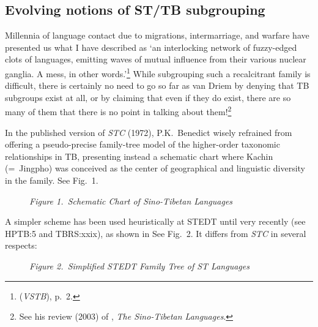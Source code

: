 \subsection{Evolving notions of ST/TB subgrouping}

Millennia of language contact due to migrations, intermarriage, and warfare have presented us what I
have described as ‘an interlocking network of fuzzy-edged clots of languages,
emitting waves of mutual influence from their various nuclear ganglia. A mess,
in other words.’\footnote{\citealt{JAM-VSTB} (\textit{VSTB}), p.~2.}  While subgrouping such
a recalcitrant family is difficult, there is certainly no need to go so far as
van Driem by denying that TB subgroups exist at all, or by claiming that even if
they do exist, there are so many of them that there is no point in talking about
them!\footnote{See his review (2003) of \citealt{STL},
\textit{The Sino-Tibetan Languages}.}


In the published version of \textit{STC} (1972),
P.K.\ Benedict wisely refrained from offering a pseudo-precise family-tree model of
the higher-order taxonomic relationships in TB, presenting instead a schematic
chart where Kachin (=~Jingpho) was conceived as the center of geographical and
linguistic diversity in the family. See Fig.~1.

\begin{figure}[ht]
\begin{center}
\textit{Figure 1.~Schematic Chart of Sino-Tibetan Languages}\footnotemark
\end{center}
\end{figure}

A simpler scheme has been used heuristically at STEDT until very recently (see HPTB:5 and TBRS:xxix), as shown in  See Fig.~2. It differs from \textit{STC} in several respects:

\begin{figure}[ht]
\begin{center}
\textit{Figure 2.~Simplified STEDT Family Tree of ST Languages}
\end{center}
\end{figure}

